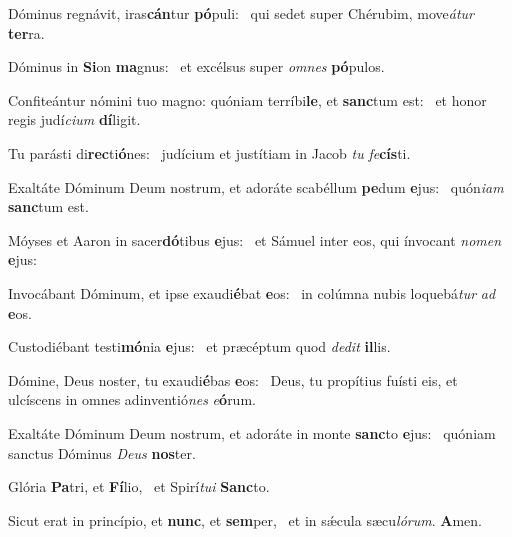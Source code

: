 \item Dóminus regnávit, iras\textbf{cán}tur \textbf{pó}puli:~\psstar{} qui sedet super Chérubim, move\textit{átur} \textbf{ter}ra.
\item Dóminus in \textbf{Si}on \textbf{ma}gnus:~\psstar{} et excélsus super \textit{omnes} \textbf{pó}pulos.
\item Confiteántur nómini tuo magno: quóniam terríbi\textbf{le}, et \textbf{sanc}tum est:~\psstar{} et honor regis judí\textit{cium} \textbf{dí}ligit.
\item Tu parásti di\textbf{rec}ti\textbf{ó}nes:~\psstar{} judícium et justítiam in Jacob \textit{tu} \textit{fe}\textbf{cís}ti.
\item Exaltáte Dóminum Deum nostrum, et adoráte scabéllum \textbf{pe}dum \textbf{e}jus:~\psstar{} quón\textit{iam} \textbf{sanc}tum est.
\item Móyses et Aaron in sacer\textbf{dó}tibus \textbf{e}jus:~\psstar{} et Sámuel inter eos, qui ínvocant \textit{nomen} \textbf{e}jus:
\item Invocábant Dóminum, et ipse exaudi\textbf{é}bat \textbf{e}os:~\psstar{} in colúmna nubis loquebá\textit{tur} \textit{ad} \textbf{e}os.
\item Custodiébant testi\textbf{mó}nia \textbf{e}jus:~\psstar{} et præcéptum quod \textit{dedit} \textbf{il}lis.
\item Dómine, Deus noster, tu exaudi\textbf{é}bas \textbf{e}os:~\psstar{} Deus, tu propítius fuísti eis, et ulcíscens in omnes adinventió\textit{nes} \textit{e}\textbf{ó}rum.
\item Exaltáte Dóminum Deum nostrum, et adoráte in monte \textbf{sanc}to \textbf{e}jus:~\psstar{} quóniam sanctus Dóminus \textit{Deus} \textbf{nos}ter.
\item Glória \textbf{Pa}tri, et \textbf{Fí}lio,~\psstar{} et Spirí\textit{tui} \textbf{Sanc}to.
\item Sicut erat in princípio, et \textbf{nunc}, et \textbf{sem}per,~\psstar{} et in sǽcula sæcu\textit{lórum}. \textbf{A}men.